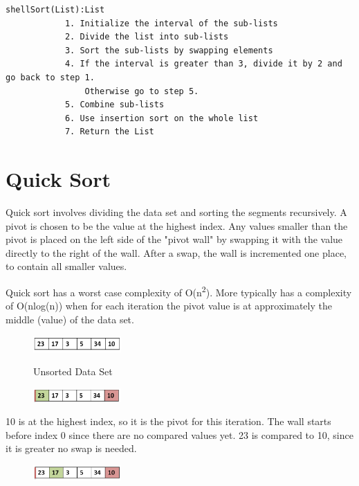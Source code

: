 \begin{verbatim}
shellSort(List):List
            1. Initialize the interval of the sub-lists
            2. Divide the list into sub-lists
            3. Sort the sub-lists by swapping elements
            4. If the interval is greater than 3, divide it by 2 and go back to step 1. 
                Otherwise go to step 5.
            5. Combine sub-lists
            6. Use insertion sort on the whole list
            7. Return the List
\end{verbatim}


\section{Quick Sort}
Quick sort involves dividing the data set and sorting the segments recursively. A pivot is chosen to be the value at the highest index. Any values smaller than the pivot is placed on the left side of the "pivot wall" by swapping it with the value directly to the right of the wall. After a swap, the wall is incremented one place, to contain all smaller values.

Quick sort has a worst case complexity of O(n\textsuperscript{2}). More typically has a complexity of O(nlog(n)) when for each iteration the pivot value is at approximately the middle (value) of the data set.  

\begin{figure}[H]
\centering
\includegraphics[width=0.3\textwidth]{pictures/quick1.png}
\label{fig:quick1}
\caption{Unsorted Data Set}
\end{figure}

\begin{figure}[H]
\centering
\includegraphics[width=0.3\textwidth]{pictures/quick2.png}
\label{fig:quick2}
\end{figure}

10 is at the highest index, so it is the pivot for this iteration. The wall starts before index 0 since there are no compared values yet. 23 is compared to 10, since it is greater no swap is needed.

\begin{figure}[H]
\centering
\includegraphics[width=0.3\textwidth]{pictures/quick3.png}
\label{fig:quick3}
\end{figure}

